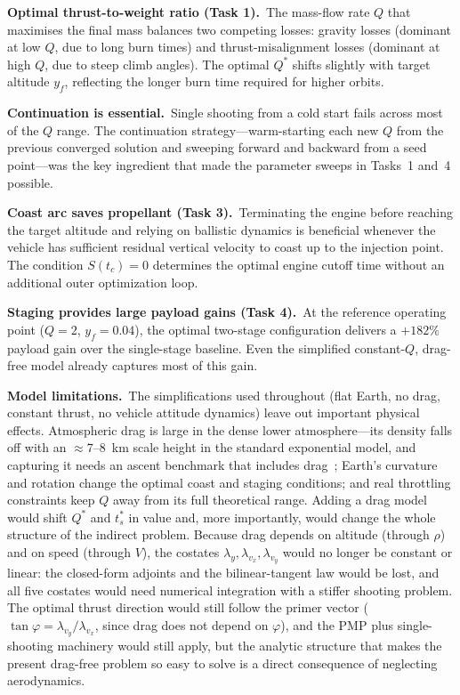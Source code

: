 \documentclass[../main.tex]{subfiles}
\begin{document}
\textbf{Optimal thrust-to-weight ratio (Task 1).}\ The mass-flow rate $Q$ that maximises the final mass balances two competing losses: gravity losses (dominant at low $Q$, due to long burn times) and thrust-misalignment losses (dominant at high $Q$, due to steep climb angles). The optimal $Q^*$ shifts slightly with target altitude $y_f$, reflecting the longer burn time required for higher orbits.

\textbf{Continuation is essential.}\ Single shooting from a cold start fails across most of the $Q$ range. The continuation strategy---warm-starting each new $Q$ from the previous converged solution and sweeping forward and backward from a seed point---was the key ingredient that made the parameter sweeps in Tasks~1 and~4 possible.

\textbf{Coast arc saves propellant (Task 3).}\ Terminating the engine before reaching the target altitude and relying on ballistic dynamics is beneficial whenever the vehicle has sufficient residual vertical velocity to coast up to the injection point. The condition $S(t_c) = 0$ determines the optimal engine cutoff time without an additional outer optimization loop.

\textbf{Staging provides large payload gains (Task 4).}\ At the reference operating point ($Q = 2$, $y_f = 0.04$), the optimal two-stage configuration delivers a $+182\%$ payload gain over the single-stage baseline. Even the simplified constant-$Q$, drag-free model already captures most of this gain.

\textbf{Model limitations.}\ The simplifications used throughout (flat Earth, no drag, constant thrust, no vehicle attitude dynamics) leave out important physical effects. Atmospheric drag is large in the dense lower atmosphere---its density falls off with an $\approx 7$--$8$~km scale height in the standard exponential model, and capturing it needs an ascent benchmark that includes drag~\cite[Sec.~6.15]{betts2010}; Earth's curvature and rotation change the optimal coast and staging conditions; and real throttling constraints keep $Q$ away from its full theoretical range. Adding a drag model would shift $Q^*$ and $t_s^*$ in value and, more importantly, would change the whole structure of the indirect problem. Because drag depends on altitude (through $\rho$) and on speed (through $V$), the costates $\lambda_y, \lambda_{v_x}, \lambda_{v_y}$ would no longer be constant or linear: the closed-form adjoints and the bilinear-tangent law would be lost, and all five costates would need numerical integration with a stiffer shooting problem. The optimal thrust direction would still follow the primer vector ($\tan\varphi = \lambda_{v_y}/\lambda_{v_x}$, since drag does not depend on $\varphi$), and the PMP plus single-shooting machinery would still apply, but the analytic structure that makes the present drag-free problem so easy to solve is a direct consequence of neglecting aerodynamics.
\end{document}
